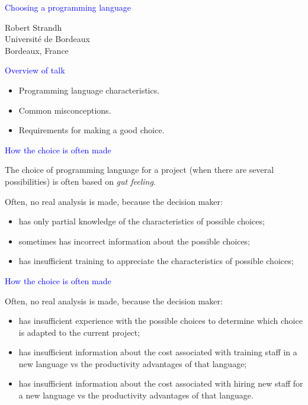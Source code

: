 \documentclass{slides}
\newcommand{\ti}[1]{\begin{center}\Large{\textcolor{blue}{#1}}\end{center}}
\begin{document}
\landscape
\setlength{\oddsidemargin}{1cm}
\setlength{\evensidemargin}{1cm}
\setlength{\marginparwidth}{1cm}
\setlength{\parskip}{0.5cm}
\setlength{\parindent}{0cm}
\begin{slide}\ti{Choosing a programming language}
\vskip 0.5cm
\begin{center}
Robert Strandh \\
Université de Bordeaux \\
Bordeaux, France
\end{center}
\vfill\end{slide}
\begin{slide}\ti{Overview of talk}

  \begin{itemize}
  \item Programming language characteristics.
  \item Common misconceptions.
  \item Requirements for making a good choice.
  \end{itemize}

\vfill\end{slide}
\begin{slide}\ti{How the choice is often made}

The choice of programming language for a project (when there are
several possibilities) is often based on \emph{gut feeling}.

Often, no real analysis is made, because the decision maker:

\begin{itemize}
\item has only partial knowledge of the characteristics of possible
  choices;
\item sometimes has incorrect information about the possible choices;
\item has insufficient training to appreciate the characteristics of
  possible choices;
\end{itemize}

\vfill\end{slide}
\begin{slide}\ti{How the choice is often made}

Often, no real analysis is made, because the decision maker:

\begin{itemize}
\item has insufficient experience with the possible choices to
  determine which choice is adapted to the current project;
\item has insufficient information about the cost associated with
  training staff in a new language vs the productivity advantages of
  that language;
\item has insufficient information about the cost associated with
  hiring new staff for a new language vs the productivity advantages of
  that language.
\end{itemize}

\vfill\end{slide}
\end{document}
